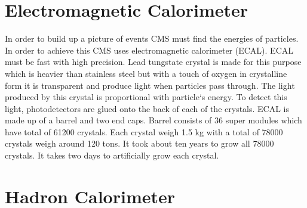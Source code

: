 \documentclass[a4paper,10pt]{article}
\begin{document}
\section{Electromagnetic Calorimeter}
In order to build up a picture of events CMS must find the energies of particles. In order to achieve this CMS uses electromagnetic calorimeter (ECAL). ECAL must be fast with high precision. 
Lead tungstate crystal is made for this purpose which is heavier than stainless steel but with a touch of oxygen in crystalline form it is transparent and produce light when particles
pass through. The light produced by this crystal is proportional with particle`s energy. To detect this light, photodetectors are glued onto the back of each of the crystals. ECAL is made up of a barrel
and two end caps. Barrel consists of 36 super modules which have total of 61200 crystals. Each crystal weigh 1.5 kg with a total of 78000 crystals weigh around 120 tons. It took about ten years to grow
all 78000 crystals. It takes two days to artificially grow each crystal.

\section{Hadron Calorimeter}
\end{document}
